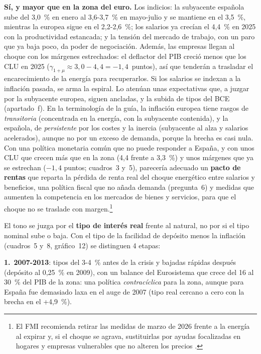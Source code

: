 \begin{examen}
\textbf{Sí, y mayor que en la zona del euro.} Los indicios: la subyacente española sube del 3,0~\% en enero al 3,6-3,7~\% en mayo-julio y se mantiene en el 3,5~\%, mientras la europea sigue en el 2,2-2,6~\%; los salarios ya crecían el 4,4~\% en 2025 con la productividad estancada; y la tensión del mercado de trabajo, con un paro que ya baja poco, da poder de negociación. Además, las empresas llegan al choque con los márgenes estrechados: el deflactor del PIB creció menos que los CLU en 2025 ($\gamma_{1+\mu}\approx3{,}0-4{,}4=-1{,}4$~puntos), así que tenderán a trasladar el encarecimiento de la energía para recuperarlos. Si los salarios se indexan a la inflación pasada, se arma la espiral. Lo atenúan unas expectativas que, a juzgar por la subyacente europea, siguen ancladas, y la subida de tipos del BCE (apartado~f). En la terminología de la guía, la inflación europea tiene rasgos de \emph{transitoria} (concentrada en la energía, con la subyacente contenida), y la española, de \emph{persistente} por los costes y la inercia (subyacente al alza y salarios acelerados), aunque no por un exceso de demanda, porque la brecha es casi nula. Con una política monetaria común que no puede responder a España, y con unos CLU que crecen más que en la zona (4,4 frente a 3,3~\%) y unos márgenes que ya se estrechan ($-1{,}4$ puntos; cuadros~3 y~5), parecería adecuado un \textbf{pacto de rentas} que reparta la pérdida de renta real del choque energético entre salarios y beneficios, una política fiscal que no añada demanda (pregunta~6) y medidas que aumenten la competencia en los mercados de bienes y servicios, para que el choque no se traslade con margen.\footnote{El FMI recomienda retirar las medidas de marzo de 2026 frente a la energía al expirar y, si el choque se agrava, sustituirlas por ayudas focalizadas en hogares y empresas vulnerables que no alteren los precios .}

El tono se juzga por el \textbf{tipo de interés real} frente al natural, no por si el tipo nominal sube o baja. Con el tipo de la facilidad de depósito menos la inflación (cuadros~5 y~8, gráfico~12) se distinguen 4 etapas:

\textbf{1.}~\textbf{2007-2013}: tipos del 3-4~\% antes de la crisis y bajadas rápidas después (depósito al 0,25~\% en 2009), con un balance del Eurosistema que crece del 16 al 30~\% del PIB de la zona: una política \emph{contracíclica} para la zona, aunque para España fue demasiado laxa en el auge de 2007 (tipo real cercano a cero con la brecha en el +4,9~\%).



\end{examen}
